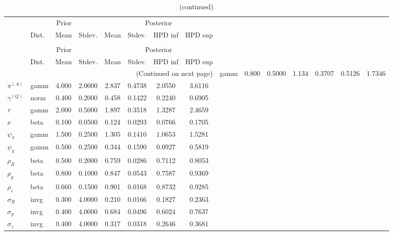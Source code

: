  
\begin{center}
\begin{longtable}{llcccccc} 
\caption{Results from Metropolis-Hastings (parameters)}
 \label{Table:MHPosterior:1}\\
\toprule 
  & \multicolumn{3}{c}{Prior}  &  \multicolumn{4}{c}{Posterior} \\
  \cmidrule(r{.75em}){2-4} \cmidrule(r{.75em}){5-8}
  & Dist. & Mean  & Stdev. & Mean & Stdev. & HPD inf & HPD sup\\
\midrule \endfirsthead 
\caption{(continued)}\\\toprule 
  & \multicolumn{3}{c}{Prior}  &  \multicolumn{4}{c}{Posterior} \\
  \cmidrule(r{.75em}){2-4} \cmidrule(r{.75em}){5-8}
  & Dist. & Mean  & Stdev. & Mean & Stdev. & HPD inf & HPD sup\\
\midrule \endhead 
\bottomrule \multicolumn{8}{r}{(Continued on next page)} \endfoot 
\bottomrule \endlastfoot 
${r_{A}}$ & gamm &   0.800 & 0.5000 &   1.134& 0.3707 &  0.5126 &  1.7346 \\ 
${\pi^{(A)}}$ & gamm &   4.000 & 2.0000 &   2.837& 0.4738 &  2.0550 &  3.6116 \\ 
${\gamma^{(Q)}}$ & norm &   0.400 & 0.2000 &   0.458& 0.1422 &  0.2240 &  0.6905 \\ 
${\tau}$ & gamm &   2.000 & 0.5000 &   1.897& 0.3518 &  1.3287 &  2.4659 \\ 
${\nu}$ & beta &   0.100 & 0.0500 &   0.124& 0.0293 &  0.0766 &  0.1705 \\ 
${\psi_\pi}$ & gamm &   1.500 & 0.2500 &   1.305& 0.1410 &  1.0653 &  1.5281 \\ 
${\psi_y}$ & gamm &   0.500 & 0.2500 &   0.344& 0.1590 &  0.0927 &  0.5819 \\ 
${\rho_R}$ & beta &   0.500 & 0.2000 &   0.759& 0.0286 &  0.7112 &  0.8053 \\ 
${\rho_{g}}$ & beta &   0.800 & 0.1000 &   0.847& 0.0543 &  0.7587 &  0.9369 \\ 
${\rho_z}$ & beta &   0.660 & 0.1500 &   0.901& 0.0168 &  0.8732 &  0.9285 \\ 
${\sigma_R}$ & invg &   0.300 & 4.0000 &   0.210& 0.0166 &  0.1827 &  0.2363 \\ 
${\sigma_{g}}$ & invg &   0.400 & 4.0000 &   0.684& 0.0496 &  0.6024 &  0.7637 \\ 
${\sigma_z}$ & invg &   0.400 & 4.0000 &   0.317& 0.0318 &  0.2646 &  0.3681 \\ 
\end{longtable}
 \end{center}
